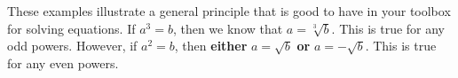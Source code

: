\documentclass{ximera}
\begin{document}
These examples illustrate a general principle that is good to have in your toolbox for solving equations. If $a^3=b$, then we know that $a = \sqrt[3]{b}$. This is true for any odd powers. However, if $a^2 =b$, then {\bf either} $a=\sqrt{b}$ {\bf or} $a = -\sqrt{b}$. This is true for any even powers.  

%
%
%
%

%
%
\end{document}
